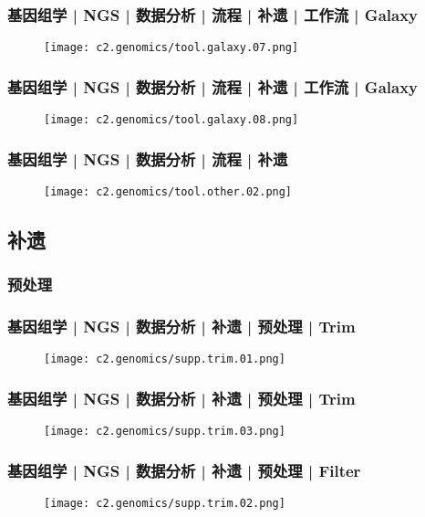 \begin{frame}
  \frametitle{基因组学 | NGS | 数据分析 | 流程 | 补遗 | 工作流 | Galaxy}
  \begin{figure}
    \centering
    \texttt{[image: c2.genomics/tool.galaxy.07.png]}
  \end{figure}
\end{frame}

\begin{frame}
  \frametitle{基因组学 | NGS | 数据分析 | 流程 | 补遗 | 工作流 | Galaxy}
  \begin{figure}
    \centering
    \texttt{[image: c2.genomics/tool.galaxy.08.png]}
  \end{figure}
\end{frame}

\begin{frame}
  \frametitle{基因组学 | NGS | 数据分析 | 流程 | 补遗}
  \begin{figure}
    \centering
    \texttt{[image: c2.genomics/tool.other.02.png]}
  \end{figure}
\end{frame}

\subsection{补遗}
\subsubsection{预处理}
\begin{frame}
  \frametitle{基因组学 | NGS | 数据分析 | 补遗 | 预处理 | Trim}
  \begin{figure}
    \centering
    \texttt{[image: c2.genomics/supp.trim.01.png]}
  \end{figure}
\end{frame}

\begin{frame}
  \frametitle{基因组学 | NGS | 数据分析 | 补遗 | 预处理 | Trim}
  \begin{figure}
    \centering
    \texttt{[image: c2.genomics/supp.trim.03.png]}
  \end{figure}
\end{frame}

\begin{frame}
  \frametitle{基因组学 | NGS | 数据分析 | 补遗 | 预处理 | Filter}
  \begin{figure}
    \centering
    \texttt{[image: c2.genomics/supp.trim.02.png]}
  \end{figure}
\end{frame}

